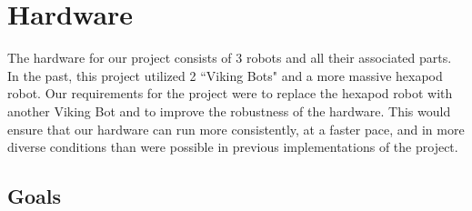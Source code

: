 \documentclass[a4paper,12pt]{article}
\begin{document}
\section{Hardware}
The hardware for our project consists of 3 robots and all their associated parts. In the past, this project utilized 2 ``Viking Bots" and a more massive hexapod robot. Our requirements for the project were to replace the hexapod robot with another Viking Bot and to improve the robustness of the hardware. This would ensure that our hardware can run more consistently, at a faster pace, and in more diverse conditions than were possible in previous implementations of the project.

\subsection{Goals}
\end{document}
